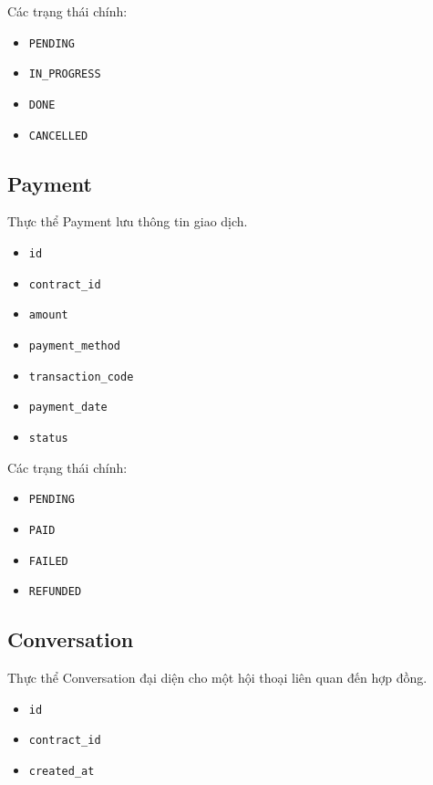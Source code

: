 Các trạng thái chính:

\begin{itemize}
    \item \texttt{PENDING}
    \item \texttt{IN\_PROGRESS}
    \item \texttt{DONE}
    \item \texttt{CANCELLED}
\end{itemize}

\subsection{Payment}

Thực thể Payment lưu thông tin giao dịch.

\begin{itemize}
    \item \texttt{id}
    \item \texttt{contract\_id}
    \item \texttt{amount}
    \item \texttt{payment\_method}
    \item \texttt{transaction\_code}
    \item \texttt{payment\_date}
    \item \texttt{status}
\end{itemize}

Các trạng thái chính:

\begin{itemize}
    \item \texttt{PENDING}
    \item \texttt{PAID}
    \item \texttt{FAILED}
    \item \texttt{REFUNDED}
\end{itemize}

\subsection{Conversation}

Thực thể Conversation đại diện cho một hội thoại liên quan đến hợp đồng.

\begin{itemize}
    \item \texttt{id}
    \item \texttt{contract\_id}
    \item \texttt{created\_at}
\end{itemize}

